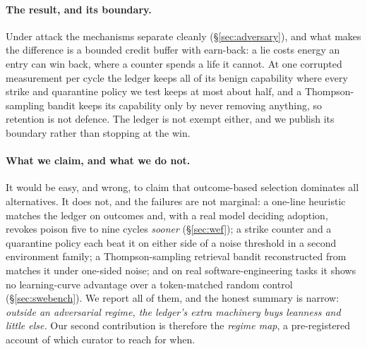 \paragraph{The result, and its boundary.}
Under attack the mechanisms separate cleanly (\S\ref{sec:adversary}), and
what makes the difference is a bounded credit buffer with earn-back: a
lie costs energy an entry can win back, where a counter spends a life it
cannot. At one corrupted measurement per cycle the ledger keeps all of
its benign capability where every strike and quarantine policy we test
keeps at most about half, and a Thompson-sampling bandit keeps its
capability only by never removing anything, so retention is not defence.
The ledger is not exempt either, and we publish its boundary rather than
stopping at the win.

\paragraph{What we claim, and what we do not.}
It would be easy, and wrong, to claim that outcome-based selection
dominates all alternatives. It does not, and the failures are not
marginal: a one-line heuristic matches the ledger on outcomes and, with a
real model deciding adoption, revokes poison five to nine cycles
\emph{sooner} (\S\ref{sec:wef}); a strike counter and a quarantine
policy each beat it on either side of a noise threshold in a second
environment family; a Thompson-sampling retrieval bandit reconstructed
from \citet{xu2026ael} matches it under one-sided noise; and on real
software-engineering tasks it shows no learning-curve advantage over a
token-matched random control (\S\ref{sec:swebench}). We report all of
them, and the honest summary is narrow: \emph{outside an adversarial
regime, the ledger's extra machinery buys leanness and little else.} Our
second contribution is therefore the \emph{regime map}, a pre-registered
account of which curator to reach for when.

